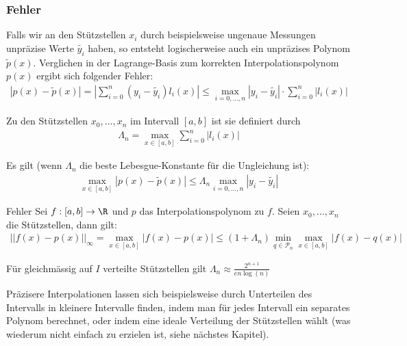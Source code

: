 \newpage
\subsubsection{Fehler}
Falls wir an den Stützstellen $x_i$ durch beispielsweise ungenaue Messungen unpräzise Werte $\tilde{y_i}$ haben,
so entsteht logischerweise auch ein unpräzises Polynom $\tilde{p}(x)$.
Verglichen in der Lagrange-Basis zum korrekten Interpolationspolynom $p(x)$ ergibt sich folgender Fehler:
\begin{align*}
    |p(x) - \tilde{p}(x)| = \left| \sum_{i = 0}^{n} (y_i - \tilde{y_i}) l_i(x) \right| \leq \max_{i = 0, \ldots, n} |y_i - \tilde{y_i}| \cdot \sum_{i = 0}^{n} |l_i(x)|
\end{align*}


 Zu den Stützstellen $x_0, \ldots, x_n$ im Intervall $[a, b]$ ist sie definiert durch
\rmvspace
\begin{align*}
    \Lambda_n = \max_{x \in [a, b]} \sum_{i = 0}^{n} |l_i(x)|
\end{align*}


 Es gilt (wenn $\Lambda_n$ die beste Lebesgue-Konstante für die Ungleichung ist):
\rmvspace
\begin{align*}
    \max_{x \in [a, b]} |p(x) - \tilde{p}(x)| \leq \Lambda_n \max_{i = 0, \ldots, n} |y_i - \tilde{y_i}|
\end{align*}

\begin{theorem}[]{Fehler}
    Sei $f : [a, b] \rightarrow \R$ und $p$ das Interpolationspolynom zu $f$. Seien $x_0, \ldots, x_n$ die Stützstellen, dann gilt:
    \rmvspace
    \begin{align*}
        ||f(x) - p(x)||_{\infty} = \max_{x \in [a, b]}|f(x) - p(x)| \leq (1 + \Lambda_n) \min_{q \in \mathcal{P}_n} \max_{x \in [a, b]} |f(x) - q(x)|
    \end{align*}
\end{theorem}

\inlineremark Für gleichmässig auf $I$ verteilte Stützstellen gilt $\displaystyle \Lambda_n \approx \frac{2^{n + 1}}{e n \log(n)}$

 

Präzisere Interpolationen lassen sich beispielsweise durch Unterteilen des Intervalls in kleinere Intervalle finden, indem man für jedes Intervall ein separates Polynom berechnet, oder indem eine ideale Verteilung der Stützstellen wählt (was wiederum nicht einfach zu erzielen ist, siehe nächstes Kapitel).
